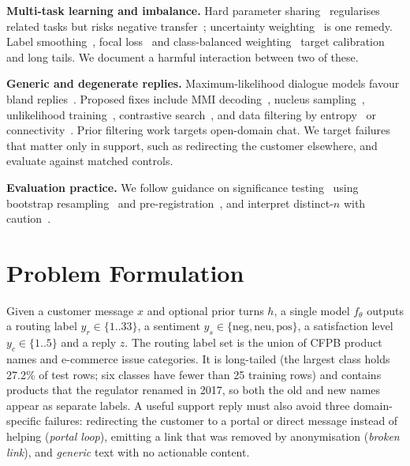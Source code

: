 \documentclass[conference]{IEEEtran}
\begin{document}
\textbf{Multi-task learning and imbalance.} Hard parameter sharing~\cite{caruana1997multitask,ruder2017overview} regularises related tasks but risks negative transfer~\cite{zhang2022survey}; uncertainty weighting~\cite{kendall2018multitask} is one remedy. Label smoothing~\cite{szegedy2016rethinking,muller2019labelsmoothing}, focal loss~\cite{lin2017focal} and class-balanced weighting~\cite{cui2019classbalanced} target calibration and long tails. We document a harmful interaction between two of these.

\textbf{Generic and degenerate replies.} Maximum-likelihood dialogue models favour bland replies~\cite{vinyals2015neural,li2016diversity}. Proposed fixes include MMI decoding~\cite{li2016diversity}, nucleus sampling~\cite{holtzman2020curious}, unlikelihood training~\cite{welleck2020neural}, contrastive search~\cite{su2022contrastive}, and data filtering by entropy~\cite{csaky2019improving} or connectivity~\cite{akama2020filtering}. Prior filtering work targets open-domain chat. We target failures that matter only in support, such as redirecting the customer elsewhere, and evaluate against matched controls.

\textbf{Evaluation practice.} We follow guidance on significance testing~\cite{dror2018hitchhiker} using bootstrap resampling~\cite{efron1979bootstrap,koehn2004statistical} and pre-registration~\cite{vanmiltenburg2021preregistering}, and interpret distinct-$n$ with caution~\cite{tevet2021evaluating}.



\section{Problem Formulation}
Given a customer message $x$ and optional prior turns $h$, a single model $f_\theta$ outputs a routing label $y_r\in\{1..33\}$, a sentiment $y_s\in\{\text{neg},\text{neu},\text{pos}\}$, a satisfaction level $y_c\in\{1..5\}$ and a reply $z$. The routing label set is the union of CFPB product names and e-commerce issue categories. It is long-tailed (the largest class holds 27.2\% of test rows; six classes have fewer than 25 training rows) and contains products that the regulator renamed in 2017, so both the old and new names appear as separate labels. A useful support reply must also avoid three domain-specific failures: redirecting the customer to a portal or direct message instead of helping (\emph{portal loop}), emitting a link that was removed by anonymisation (\emph{broken link}), and \emph{generic} text with no actionable content.
\end{document}
